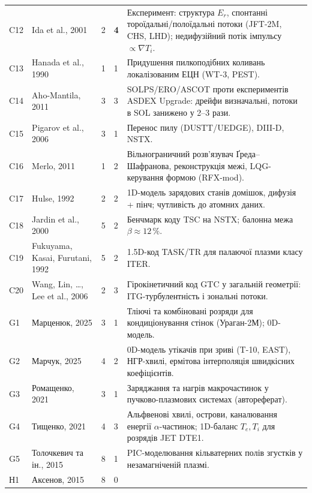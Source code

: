 \documentclass[11pt,a4paper]{article}
\newcommand{\rel}[1]{\textbf{#1}}
\begin{document}
\begin{longtable}{@{}p{0.9cm}>{\raggedright\arraybackslash}p{4.3cm}p{0.6cm}p{0.5cm}>{\raggedright\arraybackslash}p{8.6cm}@{}}
C12 & Ida et al., 2001 \cite{Ida2001} & 2 & \rel{4} &
  Експеримент: структура $E_r$, спонтанні тороїдальні/полоїдальні потоки
  (JFT-2M, CHS, LHD); недифузійний потік імпульсу $\propto\nabla T_i$. \\
C13 & Hanada et al., 1990 \cite{Hanada1990} & 1 & 1 &
  Придушення пилкоподібних коливань локалізованим ЕЦН (WT-3, PEST). \\
C14 & Aho-Mantila, 2011 \cite{AhoMantila2011} & 3 & 3 &
  SOLPS/ERO/ASCOT проти експериментів ASDEX Upgrade: дрейфи визначальні, потоки в
  SOL занижено у 2--3 рази. \\
C15 & Pigarov et al., 2006 \cite{Pigarov2006} & 3 & 1 &
  Перенос пилу (DUSTT/UEDGE), DIII-D, NSTX. \\
C16 & Merlo, 2011 \cite{Merlo2011} & 1 & 2 &
  Вільнограничний розв'язувач Ґреда--Шафранова, реконструкція межі, LQG-керування
  формою (RFX-mod). \\
C17 & Hulse, 1992 \cite{Hulse1992} & 2 & 2 &
  1D-модель зарядових станів домішок, дифузія + пінч; чутливість до атомних даних. \\
C18 & Jardin et al., 2000 \cite{Jardin2000} & 5 & 2 &
  Бенчмарк коду TSC на NSTX; балонна межа $\beta\approx12\,\%$. \\
C19 & Fukuyama, Kasai, Furutani, 1992 \cite{Fukuyama1992} & 5 & 2 &
  1.5D-код TASK/TR для палаючої плазми класу ITER. \\
C20 & Wang, Lin, \dots, Lee et al., 2006 \cite{Wang2006} & 2 & 3 &
  Гірокінетичний код GTC у загальній геометрії: ITG-турбулентність і зональні потоки. \\
G1 & Марценюк, 2025 \cite{Martsenyuk2025} & 3 & 1 &
  Тліючі та комбіновані розряди для кондиціонування стінок (Ураган-2М); 0D-модель. \\
G2 & Марчук, 2025 \cite{Marchuk2025} & 4 & 2 &
  0D-модель утікачів при зриві (T-10, EAST), НГР-хвилі, ермітова інтерполяція
  швидкісних коефіцієнтів. \\
G3 & Ромащенко, 2021 \cite{Romashchenko2021} & 3 & 1 &
  Заряджання та нагрів макрочастинок у пучково-плазмових системах (автореферат). \\
G4 & Тищенко, 2021 \cite{Tyshchenko2021} & 4 & 3 &
  Альфвенові хвилі, острови, каналювання енергії $\alpha$-частинок; 1D-баланс
  $T_e,T_i$ для розрядів JET DTE1. \\
G5 & Толочкевич та ін., 2015 \cite{Tolochkevych2015} & 8 & 1 &
  PIC-моделювання кільватерних полів згустків у незамагніченій плазмі. \\
Н1 & Аксенов, 2015 \cite{Aksenov2015} & 8 & 0 &

\end{longtable}
\end{document}

